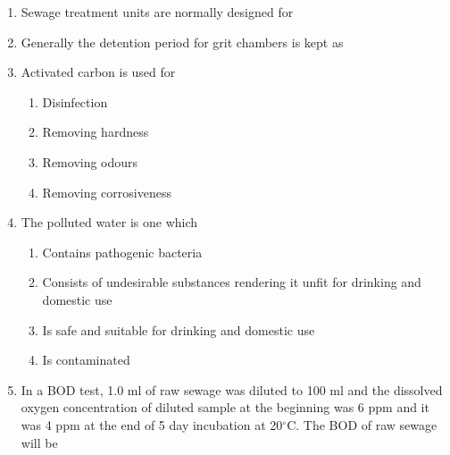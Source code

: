 \documentclass[11pt,a4paper]{article}
\begin{document}
\begin{enumerate}
\item{Sewage treatment units are normally designed for}
\\
\item{Generally the detention period for grit chambers is kept as}
\\
\item{Activated carbon is used for}
\begin{enumerate}[label=\Alph*.]
\item{Disinfection}
\item{Removing hardness}
\item{Removing odours}
\item{Removing corrosiveness}
\end{enumerate}
\item{The polluted water is one which}
\begin{enumerate}[label=\Alph*.]
\item{Contains pathogenic bacteria}
\item{Consists of undesirable substances rendering it unfit for drinking and domestic use}
\item{Is safe and suitable for drinking and domestic use}
\item{Is contaminated}
\end{enumerate}
\item{In a BOD test, 1.0 ml of raw sewage was diluted to 100 ml and the dissolved oxygen concentration of diluted sample at the beginning was 6 ppm and it was 4 ppm at the end of 5 day incubation at 20$^\circ$C. The BOD of raw sewage will be
}
\\\begin{enumerate*}[itemjoin=\qquad, label=\Alph*.]

\end{enumerate*}
\end{enumerate}
\end{document}
